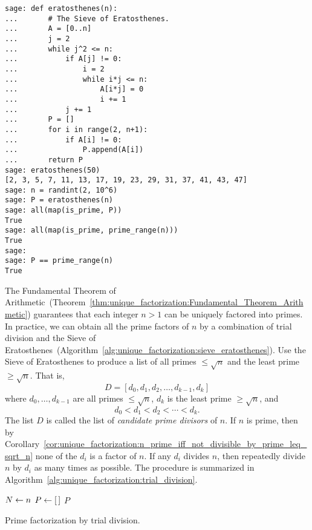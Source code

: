 \begin{lstlisting}
sage: def eratosthenes(n):
...       # The Sieve of Eratosthenes.
...       A = [0..n]
...       j = 2
...       while j^2 <= n:
...           if A[j] != 0:
...               i = 2
...               while i*j <= n:
...                   A[i*j] = 0
...                   i += 1
...           j += 1
...       P = []
...       for i in range(2, n+1):
...           if A[i] != 0:
...               P.append(A[i])
...       return P
sage: eratosthenes(50)
[2, 3, 5, 7, 11, 13, 17, 19, 23, 29, 31, 37, 41, 43, 47]
sage: n = randint(2, 10^6)
sage: P = eratosthenes(n)
sage: all(map(is_prime, P))
True
sage: all(map(is_prime, prime_range(n)))
True
sage:
sage: P == prime_range(n)
True
\end{lstlisting}

The Fundamental Theorem of
Arithmetic~(Theorem~\ref{thm:unique_factorization:Fundamental_Theorem_Arithmetic})
guarantees that each integer $n > 1$ can be uniquely factored into
primes. In practice, we can obtain all the prime factors of $n$ by a
combination of trial division and the Sieve of
Eratosthenes~(Algorithm~\ref{alg:unique_factorization:sieve_eratosthenes}). Use
the Sieve of Eratosthenes to produce a list of all primes
$\leq \sqrt{n}$ and the least prime $\geq \sqrt{n}$. That is,
\[
D
=
[d_0, d_1, d_2, \dots, d_{k-1}, d_k]
\]
where $d_0, \dots, d_{k-1}$ are all primes $\leq \sqrt{n}$, $d_k$ is
the least prime $\geq \sqrt{n}$, and
\[
d_0 < d_1 < d_2 < \cdots < d_k.
\]
The list $D$ is called the list of \emph{candidate prime divisors}
 of $n$. If $n$ is prime, then by
Corollary~\ref{cor:unique_factorization:n_prime_iff_not_divisible_by_prime_leq_sqrt_n}
none of the $d_i$ is a factor of $n$. If any $d_i$ divides $n$, then
repeatedly divide $n$ by $d_i$ as many times as possible. The
procedure is summarized in
Algorithm~\ref{alg:unique_factorization:trial_division}.
{\color{red}{This algorithm is wrong; rework it!}}

\begin{algorithm}[!htpb]
\dontprintsemicolon
\BlankLine
$N \leftarrow n$\;
$P \leftarrow [\,]$ \;
\Return $P$
\caption{Prime factorization by trial division.}
\label{alg:unique_factorization:trial_division}
\end{algorithm}

